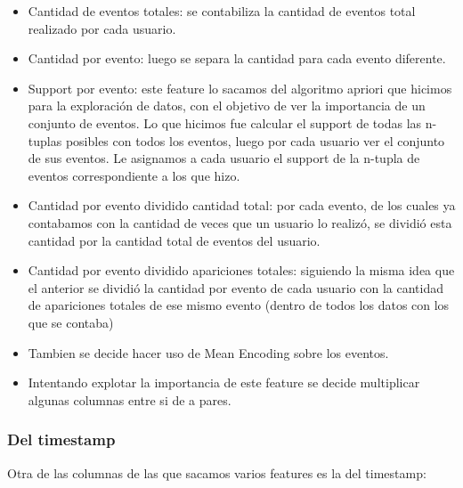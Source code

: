\documentclass[a4paper]{article}
\begin{document}
        \begin{itemize}
            \item Cantidad de eventos totales: se contabiliza la cantidad de eventos total realizado por cada usuario.
            
            \item Cantidad por evento: luego se separa la cantidad para cada evento diferente.\\
            
            \item Support por evento: este feature lo sacamos del algoritmo apriori que hicimos para la exploración de datos, con el objetivo de ver la importancia de un conjunto de eventos. Lo que hicimos fue calcular el support de todas las n-tuplas posibles con todos los eventos, luego por cada usuario ver el conjunto de sus eventos. Le asignamos a cada usuario el support de la n-tupla de eventos correspondiente a los que hizo.\\
            
            \item Cantidad por evento dividido cantidad total: por cada evento, de los cuales ya contabamos con la cantidad de veces que un usuario lo realizó, se dividió esta cantidad por la cantidad total de eventos del usuario.
            
            \item Cantidad por evento dividido apariciones totales: siguiendo la misma idea que el anterior se dividió la cantidad por evento de cada usuario con la cantidad de apariciones totales de ese mismo evento (dentro de todos los datos con los que se contaba)
            
            \item Tambien se decide hacer uso de Mean Encoding sobre los eventos.
            
            \item Intentando explotar la importancia de este feature se decide multiplicar algunas columnas entre si de a pares.
        \end{itemize}
        
        \subsubsection{Del timestamp}\label{subsubsec:timestamp}
      
        Otra de las columnas de las que sacamos varios features es la del timestamp:\\
        
\end{document}
